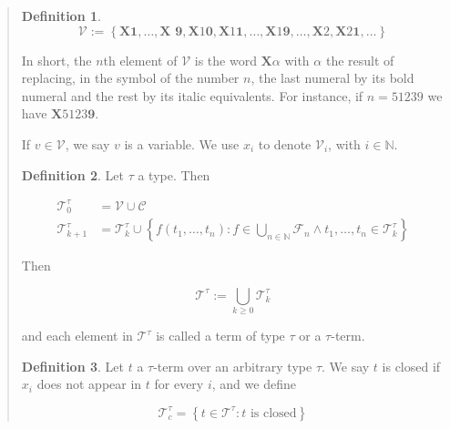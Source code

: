 \documentclass[a4paper, 12pt]{article}
\theoremstyle{definition}
\theoremstyle{definition}
\theoremstyle{definition}
\newtheorem{definition}{Definition}
\begin{document}
\begin{quote}
\begin{definition}
    \begin{equation*}
        \mathcal{V} := \left\{ \textbf{X1}, \ldots, \textbf{X 9}, \textbf{X}\textit{1}\textbf{0}, \textbf{X}\textit{1}\textbf{1},\ldots, \textbf{X}\textit{1}\textbf{9}, \ldots, \textbf{X}\textit{2}, \textbf{X}\textit{2}\textbf{1}, \ldots \right\} 
    \end{equation*}
\end{definition}

In short, the $n$th element of $\mathcal{V}$ is the word $\textbf{X}\alpha$ with $\alpha$
the result of replacing, in the symbol of the number $n$, the last numeral 
by its bold numeral and the rest by its italic equivalents. For instance, if 
$n = 51239$ we have $\textbf{X}\textit{5123}\textbf{9}$.

If $v \in \mathcal{V}$, we say $v$ is a variable. We use $x_i$ to denote $\mathcal{V}_{i}$,
with $i \in \mathbb{N}$.

\begin{definition}
    Let $\tau$ a type. Then 

    \begin{align*}
        \mathcal{T}_0^{\tau} &= \mathcal{V} \cup \mathcal{C} \\ 
        \mathcal{T}_{k+1}^{\tau} &= \mathcal{T}_k^{\tau} \cup \left\{ f(t_1, \ldots, t_n) : f \in \bigcup_{n\in \mathbb{N}} \mathcal{F}_n \land t_1,\ldots, t_n \in \mathcal{T}_k^{\tau} \right\} 
    \end{align*}

    Then 

    \begin{equation*}
        \mathcal{T}^{\tau} := \bigcup_{k\geq 0} \mathcal{T}_k^{\tau}
    \end{equation*}

    and each element in $\mathcal{T}^\tau$ is called a term of type $\tau$ or a $\tau$-term.
\end{definition}

\begin{definition}
    Let $t$ a $\tau$-term over an arbitrary type $\tau$. We say $t$ is closed if $x_i$ does not 
    appear in $t$ for every $i$, and we define 

    \begin{equation*}
        \mathcal{T}_c^{\tau} = \left\{ t \in \mathcal{T}^{\tau} : t \text{ is closed} \right\} 
    \end{equation*}
\end{definition}


\small
\begin{quote}


\end{quote}
\end{quote}
\end{document}
